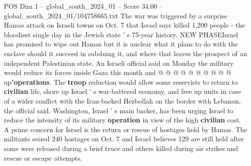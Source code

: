 \begin{textsample}{POS Dim 1 – global\_south\_2024\_01 – Score 34.00 – global\_south\_2024\_01/104758665.txt}
The war was triggered by a surprise Hamas attack on Israeli towns on Oct. 7 that Israel says killed 1,200 people - the bloodiest single day in the Jewish state ' s 75-year history.
NEW PHASEIsrael has promised to wipe out Hamas but it is unclear what it plans to do with the enclave should it succeed in subduing it, and where that leaves the prospect of an independent Palestinian state.
An Israeli official said on Monday the military would reduce its forces inside Gaza this month and @ @ @ @ @ @ @ @ @ @ up"\textbf{operations}.
The \textbf{troop} reduction would allow some reservists to return to \textbf{civilian} life, shore up Israel ' s war-battered economy, and free up units in case of a wider conflict with the Iran-backed Hezbollah on the border with Lebanon, the official said.
Washington, Israel ' s main backer, has been urging Israel to reduce the intensity of its military \textbf{operation} in view of the high \textbf{civilian} cost.
A prime concern for Israel is the return or rescue of hostages held by Hamas.
The militants seized 240 hostages on Oct. 7 and Israel believes 129 are still held after some were released during a brief truce and others killed during air strikes and rescue or escape attempts.

\end{textsample}
